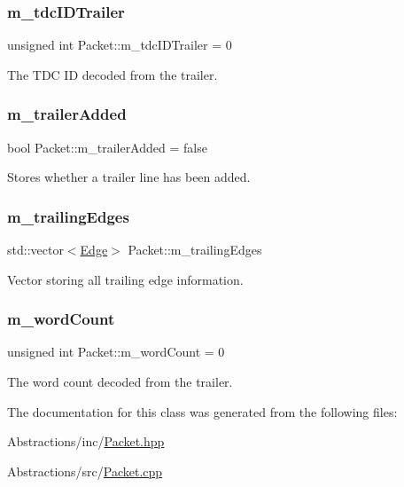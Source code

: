 \subsubsection{\texorpdfstring{m\+\_\+tdc\+I\+D\+Trailer}{m\_tdcIDTrailer}}
{\footnotesize\ttfamily unsigned int Packet\+::m\+\_\+tdc\+I\+D\+Trailer = 0\hspace{0.3cm}{\ttfamily [private]}}



The T\+DC ID decoded from the trailer. 

\mbox{\label{class_packet_a046581698cdcca7297109ceaeed7e014}} 
\subsubsection{\texorpdfstring{m\+\_\+trailer\+Added}{m\_trailerAdded}}
{\footnotesize\ttfamily bool Packet\+::m\+\_\+trailer\+Added = false\hspace{0.3cm}{\ttfamily [private]}}



Stores whether a trailer line has been added. 

\mbox{\label{class_packet_a0a91b78992e75fd203a187dcb34a81c1}} 
\subsubsection{\texorpdfstring{m\+\_\+trailing\+Edges}{m\_trailingEdges}}
{\footnotesize\ttfamily std\+::vector$<$\hyperlink{class_edge}{Edge}$>$ Packet\+::m\+\_\+trailing\+Edges\hspace{0.3cm}{\ttfamily [private]}}



Vector storing all trailing edge information. 

\mbox{\label{class_packet_a6c3f1d98101c049bc032aca63d244b89}} 
\subsubsection{\texorpdfstring{m\+\_\+word\+Count}{m\_wordCount}}
{\footnotesize\ttfamily unsigned int Packet\+::m\+\_\+word\+Count = 0\hspace{0.3cm}{\ttfamily [private]}}



The word count decoded from the trailer. 



The documentation for this class was generated from the following files\+:\begin{DoxyCompactItemize}
\item 
Abstractions/inc/\hyperlink{_packet_8hpp}{Packet.\+hpp}\item 
Abstractions/src/\hyperlink{_packet_8cpp}{Packet.\+cpp}\end{DoxyCompactItemize}
